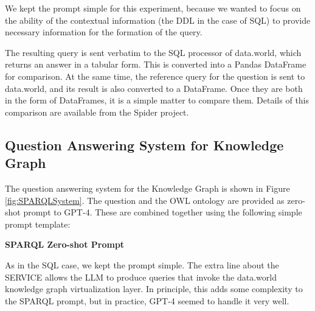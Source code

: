 \documentclass[11pt]{article}
\begin{document}
\noindent We kept the prompt simple for this experiment, because we wanted to focus on the ability of the contextual information (the DDL in the case of SQL) to provide necessary information for the formation of the query. 

The resulting query is sent verbatim to the SQL processor of data.world, which returns an answer in a tabular form.  
This is converted into a Pandas DataFrame for comparison. 
At the same time, the reference query for the question is sent to data.world, and its result is also converted to a DataFrame.  
Once they are both in the form of DataFrames, it is a simple matter to compare them.  
Details of this comparison are available from the Spider project\cite{data-spider}. 





\subsection{Question Answering System for Knowledge Graph}

The question answering system for the Knowledge Graph is shown in Figure \ref{fig:SPARQLSystem}.  
The question and the OWL ontology are provided as zero-shot prompt to GPT-4. 
These are combined together using the following simple prompt template:










\noindent\textbf{SPARQL Zero-shot Prompt}







As in the SQL case, we kept the prompt simple.  
The extra line about the SERVICE allows the LLM to produce queries that invoke the data.world knowledge graph virtualization layer.  
In principle, this adds some complexity to the SPARQL prompt, but in practice, GPT-4 seemed to handle it very well. 
\end{document}
